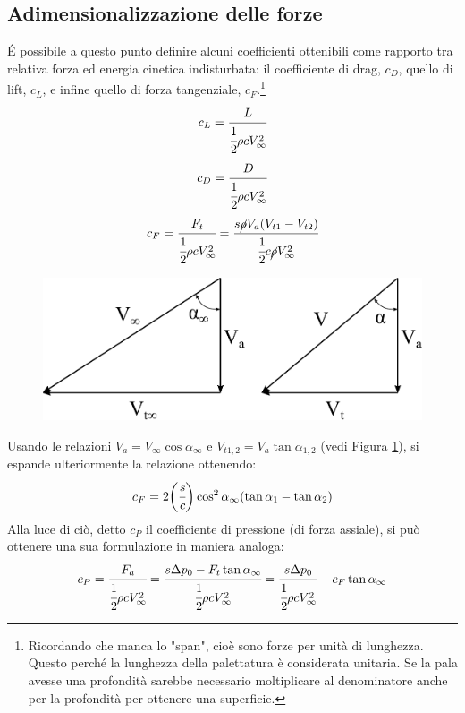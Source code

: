 \subsection{Adimensionalizzazione delle forze}
\'E possibile a questo punto definire alcuni coefficienti ottenibili come rapporto tra relativa forza ed energia cinetica indisturbata: il coefficiente di drag, $c_D$, quello di lift, $c_L$, e infine quello di forza tangenziale, $c_F$.\footnote{Ricordando che manca lo "span", cioè sono forze per unità di lunghezza. Questo perché la lunghezza della palettatura è considerata unitaria. Se la pala avesse una profondità sarebbe necessario moltiplicare al denominatore anche per la profondità per ottenere una superficie.}
\begin{align*}
c_L = \cfrac{L}{\cfrac{1}{2} \rho c V_{\infty}^2}
\end{align*}
\begin{align*}
c_D = \cfrac{D}{\cfrac{1}{2} \rho c V_{\infty}^2}
\end{align*}
\begin{align*}
c_F = \cfrac{F_t}{\cfrac{1}{2} \rho c V_{\infty}^2} = \cfrac{s \cancel{\rho} V_a (V_{t1}-V_{t2})}{\cfrac{1}{2} c \cancel{\rho} V_{\infty}^2}
\end{align*}
\begin{figure}
\centering
  \includegraphics[width=.6\textwidth]{fig/trigrel.pdf}
\caption{}
\label{fig:trigrel}
\end{figure}
Usando le relazioni $V_a = V_{\infty} \cos \alpha_{\infty}$ e $V_{t1,2} = V_a \tan \alpha_{1,2}$ (vedi Figura \ref{fig:trigrel}), si espande ulteriormente la relazione ottenendo:
\begin{equation}
c_F = 2 \bigg(\cfrac{s}{c} \bigg) \cos ^ 2 \alpha_{\infty}(\tan \alpha_1 - \tan \alpha_2)
\end{equation}
Alla luce di ciò, detto $c_P$ il coefficiente di pressione (di forza assiale), si può ottenere una sua formulazione in maniera analoga:
\begin{align*}
c_P = \cfrac{F_a}{\cfrac{1}{2} \rho c V_{\infty}^2} = \cfrac{s \Delta p_0 - F_t \tan \alpha_{\infty}}{\cfrac{1}{2} \rho c V_{\infty}^2} = \cfrac{s \Delta p_0}{\cfrac{1}{2} \rho c V_{\infty}^2} - c_F \tan \alpha_{\infty}
\end{align*}
